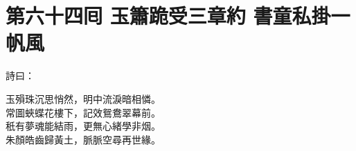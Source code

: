 
\chapter*{第六十四囘 玉簫跪受三章約 書童私掛一帆風}


詩曰：

\begin{myquote} 
玉殞珠沉思悄然，明中流淚暗相憐。\\常圖蛺蝶花樓下，記效鴛鴦翠幕前。\\秖有夢魂能結雨，更無心緒學非烟。\\朱顏皓齒歸黃土，脈脈空尋再世緣。
\end{myquote} 

